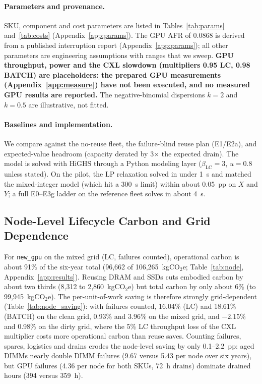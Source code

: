 \documentclass{article} %
\begin{document}
\paragraph{Parameters and provenance.} SKU, component and cost parameters are listed in Tables~\ref{tab:params} and~\ref{tab:costs} (Appendix~\ref{app:params}). The GPU AFR of 0.0868 is derived from a published interruption report (Appendix~\ref{app:params}); all other parameters are engineering assumptions with ranges that we sweep. \textbf{GPU throughput, power and the CXL slowdown (multipliers 0.95 LC, 0.98 BATCH) are placeholders: the prepared GPU measurements (Appendix~\ref{app:measure}) have not been executed, and no measured GPU results are reported.} The negative-binomial dispersions $k=2$ and $k=0.5$ are illustrative, not fitted.

\paragraph{Baselines and implementation.} We compare against the no-reuse fleet, the failure-blind reuse plan (E1/E2a), and expected-value headroom (capacity derated by 3$\times$ the expected drain). The model is solved with HiGHS through a Python modeling layer ($\beta_{\text{LC}}=3$, $u=0.8$ unless stated). On the pilot, the LP relaxation solved in under 1~s and matched the mixed-integer model (which hit a 300~s limit) within about 0.05~pp on $X$ and $Y$; a full E0--E3g ladder on the reference fleet solves in about 4~s.

\subsection{Node-Level Lifecycle Carbon and Grid Dependence}
\label{sec:node}
For \texttt{new\_gpu} on the mixed grid (LC, failures counted), operational carbon is about 91\% of the six-year total (96,662 of 106,265~kgCO$_2$e; Table~\ref{tab:node}, Appendix~\ref{app:results}). Reusing DRAM and SSDs cuts embodied carbon by about two thirds (8,312 to 2,860~kgCO$_2$e) but total carbon by only about 6\% (to 99,945~kgCO$_2$e). The per-unit-of-work saving is therefore strongly grid-dependent (Table~\ref{tab:node_saving}): with failures counted, 16.04\% (LC) and 18.61\% (BATCH) on the clean grid, 0.93\% and 3.96\% on the mixed grid, and $-2.15\%$ and 0.98\% on the dirty grid, where the 5\% LC throughput loss of the CXL multiplier costs more operational carbon than reuse saves. Counting failures, spares, logistics and drains erodes the node-level saving by only 0.1--2.2~pp: aged DIMMs nearly double DIMM failures (9.67 versus 5.43 per node over six years), but GPU failures (4.36 per node for both SKUs, 72~h drains) dominate drained hours (394 versus 359~h).
\end{document}
